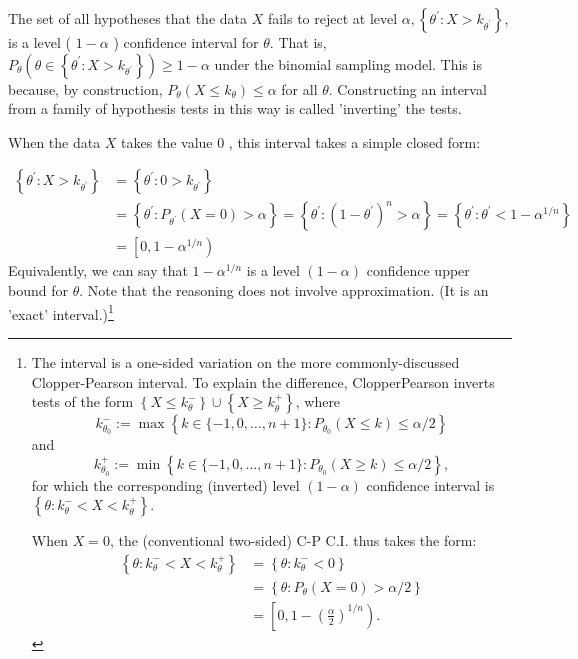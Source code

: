 The set of all hypotheses that the data $X$ fails to reject at level $\alpha,\left\{\theta^{\prime}: X>k_{\theta^{\prime}}\right\}$, is a level ( $1-\alpha$ ) confidence interval for $\theta$. That is, $P_{\theta}\left(\theta \in\left\{\theta^{\prime}: X>k_{\theta^{\prime}}\right\}\right) \geq 1-\alpha$ under the binomial sampling model. This is because, by construction, $P_{\theta}\left(X \leq k_{\theta}\right) \leq \alpha$ for all $\theta$. Constructing an interval from a family of hypothesis tests in this way is called 'inverting' the tests.

When the data $X$ takes the value 0 , this interval takes a simple closed form:

\begin{align}
\label{eq:2}
\left\{\theta^{\prime}: X>k_{\theta^{\prime}}\right\} & =\left\{\theta^{\prime}: 0>k_{\theta^{\prime}}\right\} \\
\label{eq:3}
& =\left\{\theta^{\prime}: P_{\theta^{\prime}}(X=0)>\alpha\right\}=\left\{\theta^{\prime}:\left(1-\theta^{\prime}\right)^{n}>\alpha\right\}=\left\{\theta^{\prime}: \theta^{\prime}<1-\alpha^{1 / n}\right\}  \\
\label{eq:4}
& =\left[0,1-\alpha^{1 / n}\right) 
\end{align}
Equivalently, we can say that $1-\alpha^{1 / n}$ is a level $(1-\alpha)$ confidence upper bound for $\theta$. Note that the reasoning does not involve approximation. (It is an 'exact' interval.)\footnote{
The interval is a one-sided variation on the more commonly-discussed Clopper-Pearson interval. To explain the difference, ClopperPearson inverts tests of the form $\left\{X \leq k_{\theta}^{-}\right\} \cup\left\{X \geq k_{\theta}^{+}\right\}$, where
\begin{equation}\label{eq:5}
k_{\theta_{0}}^{-}:=\max \left\{k \in\{-1,0, \ldots, n+1\}: P_{\theta_{0}}(X \leq k) \leq \alpha / 2\right\} 
\end{equation}
and
\begin{equation}\label{eq:6}
k_{\theta_{0}}^{+}:=\min \left\{k \in\{-1,0, \ldots, n+1\}: P_{\theta_{0}}(X \geq k) \leq \alpha / 2\right\}, 
\end{equation}
for which the corresponding (inverted) level $(1-\alpha)$ confidence interval is $\left\{\theta: k_{\theta}^{-}<X<k_{\theta}^{+}\right\}$.

When $X=0$, the (conventional two-sided) C-P C.I. thus takes the form:
\begin{align}
\left\{\theta: k_{\theta}^{-}<X<k_{\theta}^{+}\right\} 
\label{eq:7}
& =\left\{\theta: k_{\theta}^{-}<0\right\}  \\
\label{eq:8}
& =\left\{\theta: P_{\theta}(X=0)>\alpha / 2\right\} \\
\label{eq:9}
& =\left[0,1-\left(\frac{\alpha}{2}\right)^{1 / n}\right) . 
\end{align}
}

